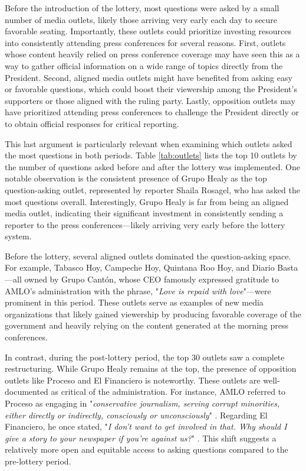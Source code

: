 Before the introduction of the lottery, most questions were asked by a small number of media outlets, likely those arriving very early each day to secure favorable seating. Importantly, these outlets could prioritize investing resources into consistently attending press conferences for several reasons. First, outlets whose content heavily relied on press conference coverage may have seen this as a way to gather official information on a wide range of topics directly from the President. Second, aligned media outlets might have benefited from asking easy or favorable questions, which could boost their viewership among the President's supporters or those aligned with the ruling party. Lastly, opposition outlets may have prioritized attending press conferences to challenge the President directly or to obtain official responses for critical reporting.

This last argument is particularly relevant when examining which outlets asked the most questions in both periods. Table \ref{tab:outlets} lists the top 10 outlets by the number of questions asked before and after the lottery was implemented. One notable observation is the consistent presence of Grupo Healy as the top question-asking outlet, represented by reporter Shaila Rosagel, who has asked the most questions overall. Interestingly, Grupo Healy is far from being an aligned media outlet, indicating their significant investment in consistently sending a reporter to the press conferences—likely arriving very early before the lottery system.

Before the lottery, several aligned outlets dominated the question-asking space. For example, Tabasco Hoy, Campeche Hoy, Quintana Roo Hoy, and Diario Basta—all owned by Grupo Cantón, whose CEO famously expressed gratitude to AMLO's administration with the phrase, "\textit{Love is repaid with love}"—were prominent in this period. These outlets serve as examples of new media organizations that likely gained viewership by producing favorable coverage of the government and heavily relying on the content generated at the morning press conferences.



In contrast, during the post-lottery period, the top 30 outlets saw a complete restructuring. While Grupo Healy remains at the top, the presence of opposition outlets like Proceso and El Financiero is noteworthy. These outlets are well-documented as critical of the administration. For instance, AMLO referred to Proceso as engaging in "\textit{conservative journalism, serving corrupt minorities, either directly or indirectly, consciously or unconsciously}" \citep{Attack-Proceso}. Regarding El Financiero, he once stated, "\textit{I don't want to get involved in that. Why should I give a story to your newspaper if you're against us?}" \citep{Attack-Financiero}. This shift suggests a relatively more open and equitable access to asking questions compared to the pre-lottery period.

